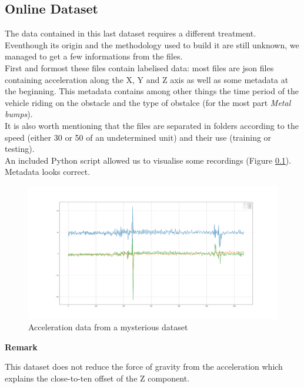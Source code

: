 \subsection{Online Dataset}
The data contained in this last dataset requires a different treatment. Eventhough its origin and the methodology used to build it are still unknown, we managed to get a few informations from the files.\\
First and formost these files contain labelised data: most files are \textsf{json} files containing acceleration along the X, Y and Z axis as well as some metadata at the beginning. This metadata contains among other things the time period of the vehicle riding on the obstacle and the type of obstalce (for the most part \textit{Metal bumps}).\\
It is also worth mentioning that the files are separated in folders according to the speed (either 30 or 50 of an undetermined unit) and their use (training or testing).\\

An included Python script allowed us to visualise some recordings (Figure \ref{}). Metadata looks correct.\\

\begin{figure}
    \center
    \includegraphics[scale=.25]{img/online_bumps.png}
    \caption{Acceleration data from a mysterious dataset}
    \label{online_bumps}
\end{figure}

\noindent
\begin{minipage}[!hc]{0.12\textwidth}
   \textbf{Remark}
\end{minipage}
\vrule\enskip\vrule\quad\begin{minipage}{\dimexpr 0.87\textwidth-0.8pt-1.5em}
This dataset does not reduce the force of gravity from the acceleration which explains the close-to-ten offset of the Z component.
\end{minipage}